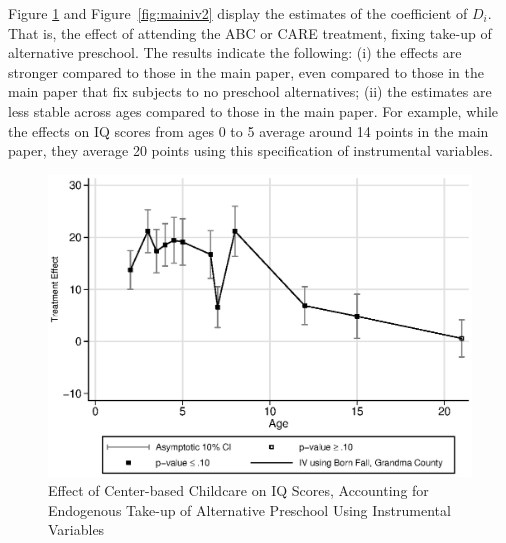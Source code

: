 \begin{appendices}
\noindent Figure \ref{fig:main_iv1} and Figure~\ref{fig:mainiv2} display the estimates of the coefficient of $D_{i}$. That is, the effect of attending the ABC or CARE treatment, fixing take-up of alternative preschool. The results indicate the following: (i) the effects are stronger compared to those in the main paper, even compared to those in the main paper that fix subjects to no preschool alternatives; (ii) the estimates are less stable across ages compared to those in the main paper. For example, while the effects on IQ scores from ages 0 to 5 average around 14 points in the main paper, they average 20 points using this specification of instrumental variables. 

\begin{figure}[H]
		\caption{Effect of Center-based Childcare on IQ Scores, Accounting for Endogenous Take-up of Alternative Preschool Using Instrumental Variables} \label{fig:main_iv1}
		\includegraphics[width=.7\columnwidth]{output/appendixplots/main_iv_te.eps}
\end{figure}


\end{appendices}
